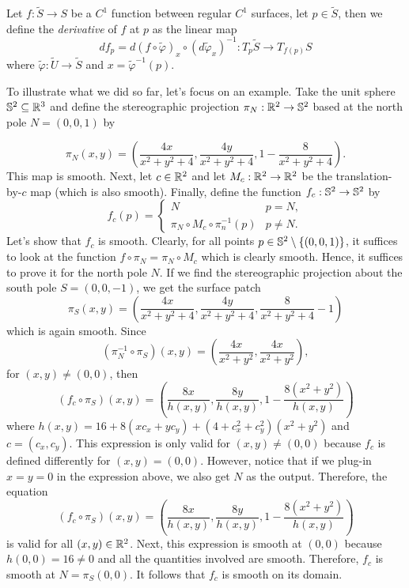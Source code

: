 \begin{definition}
    Let $f : \tilde{S} \to S$ be a $C^1$ function between regular $C^1$ surfaces, let $p \in \tilde{S}$, then we define the \textit{derivative} of $f$ at $p$ as the linear map
    $$df_p = d(f \circ \tilde{\varphi})_x \circ \left(d\tilde{\varphi}_x\right)^{-1} : T_p\tilde{S} \to T_{f(p)}S$$
    where $\tilde{\varphi} : \tilde{U} \to \tilde{S}$ and $x = \tilde{\varphi}^{-1}(p)$.
\end{definition}

To illustrate what we did so far, let's focus on an example. Take the unit sphere $\S^2 \subseteq \R^3$ and define the stereographic projection $\pi_N : \R^2 \to \S^2$ based at the north pole $N = (0,0,1)$ by

$$\pi_N(x,y) = \left(\frac{4x}{x^2 + y^2 + 4}, \frac{4y}{x^2 + y^2 + 4}, 1 - \frac{8}{x^2 + y^2 + 4}\right).$$ This map is smooth. Next, let $c \in \R^2$ and let $M_c : \R^2 \to \R^2$ be the translation-by-$c$ map (which is also smooth). Finally, define the function $f_c : \S^2 \to \S^2$ by
$$f_c(p) = \begin{cases}
    N & p=N,\\
    \pi_N\circ M_c \circ \pi_n^{-1}(p) & p \neq N.
\end{cases}$$
Let's show that $f_c$ is smooth. Clearly, for all points $p \in \S^2 \setminus \{(0,0,1)\}$, it suffices to look at the function $f\circ \pi_N = \pi_N\circ M_c$ which is clearly smooth. Hence, it suffices to prove it for the north pole $N$. If we find the stereographic projection about the south pole $S = (0,0,-1)$, we get the surface patch
$$\pi_S(x,y) = \left(\frac{4x}{x^2 + y^2 + 4}, \frac{4y}{x^2 + y^2 + 4}, \frac{8}{x^2 + y^2 + 4} - 1\right)$$ which is again smooth. Since
$$(\pi_N^{-1} \circ \pi_S)(x,y) = \left(\frac{4x}{x^2+y^2}, \frac{4x}{x^2+y^2}\right),$$
for $(x,y) \neq (0,0)$, then 
$$(f_c \circ \pi_S)(x,y) = \left(\frac{8x}{h(x,y)}, \frac{8y}{h(x,y)}, 1 - \frac{8(x^2 + y^2)}{h(x,y)}\right)$$
where $h(x,y) = 16 + 8(xc_x + yc_y) + (4+ c_x^2 + c_y^2)(x^2 + y^2)$ and $c = (c_x, c_y)$. This expression is only valid for $(x,y) \neq (0,0)$ because $f_c$ is defined differently for $(x,y) = (0,0)$. However, notice that if we plug-in $x = y= 0$ in the expression above, we also get $N$ as the output. Therefore, the equation 
$$(f_c \circ \pi_S)(x,y) = \left(\frac{8x}{h(x,y)}, \frac{8y}{h(x,y)}, 1 - \frac{8(x^2 + y^2)}{h(x,y)}\right)$$
is valid for all $(x,y) \in \R^2$. Next, this expression is smooth at $(0,0)$ because $h(0,0) = 16 \neq 0$ and all the quantities involved are smooth. Therefore, $f_c$ is smooth at $N = \pi_S(0,0)$. It follows that $f_c$ is smooth on its domain.\\

